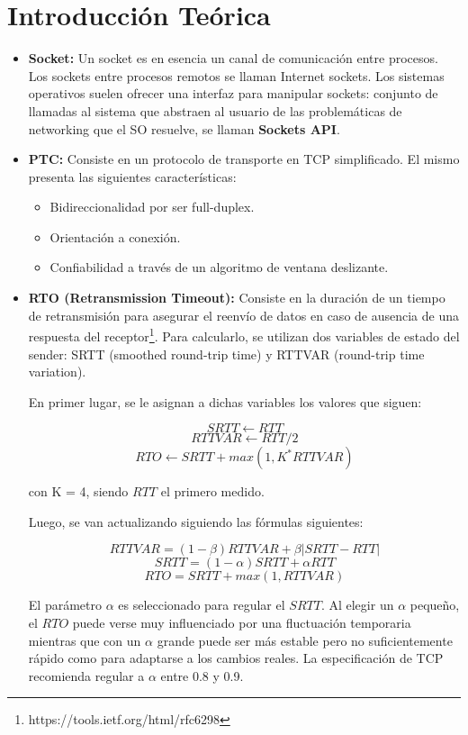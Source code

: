 \documentclass[10pt, a4paper]{article}
\begin{document}
\section{Introducción Teórica}
\begin{itemize}

\item \textbf{Socket:} Un socket es en esencia un canal de comunicación entre procesos. Los sockets entre procesos remotos se llaman Internet sockets. Los sistemas operativos suelen ofrecer una interfaz para manipular sockets: conjunto de llamadas al sistema que abstraen al usuario de las problemáticas de networking que el SO resuelve, se llaman \textbf{Sockets API}.

\item \textbf{PTC:} Consiste en un protocolo de transporte en TCP simplificado. El mismo presenta las siguientes características:
\begin{itemize} 
\item Bidireccionalidad por ser full-duplex.
\item Orientación a conexión.
\item Confiabilidad a través de un algoritmo de ventana deslizante.
\end{itemize}

\item \textbf{RTO (Retransmission Timeout):} Consiste en la duración de un tiempo de retransmisión para asegurar el reenvío de datos en caso de ausencia de una respuesta del receptor\footnote{https://tools.ietf.org/html/rfc6298}. Para calcularlo, se utilizan dos variables de estado del sender: SRTT (smoothed round-trip time) y RTTVAR (round-trip time variation).

En primer lugar, se le asignan a dichas variables los valores que siguen:

			$$SRTT \leftarrow RTT$$
            $$RTTVAR \leftarrow RTT/2$$
            $$RTO \leftarrow SRTT + max(1, K^*RTTVAR)$$
            
con K = 4, siendo $RTT$ el primero medido.

Luego, se van actualizando siguiendo las fórmulas siguientes:

$$RTTVAR = (1 - \beta) RTTVAR + \beta |SRTT - RTT|$$
$$SRTT = (1 - \alpha)SRTT + \alpha RTT$$
$$RTO = SRTT + max(1, RTTVAR)$$

El parámetro $\alpha$ es seleccionado para regular el $SRTT$. Al elegir un $\alpha$ pequeño, el $RTO$ puede verse muy influenciado por una fluctuación temporaria mientras que con un $\alpha$ grande puede ser más estable pero no suficientemente rápido como para adaptarse a los cambios reales. La especificación de TCP recomienda regular a $\alpha$ entre 0.8 y 0.9.
\end{itemize}
\end{document}
